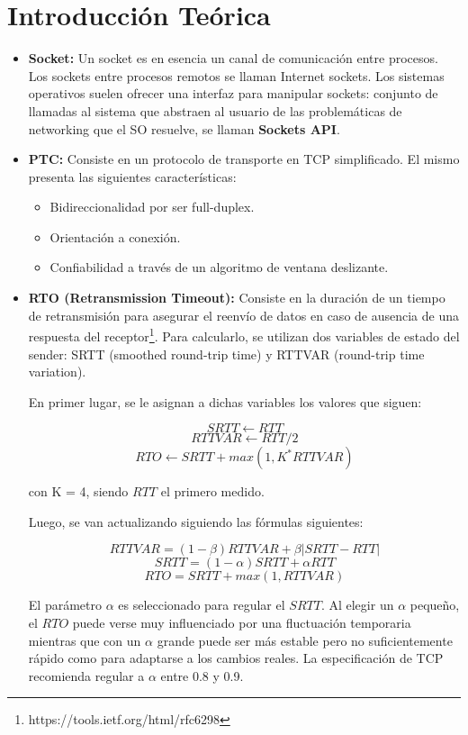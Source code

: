 \documentclass[10pt, a4paper]{article}
\begin{document}
\section{Introducción Teórica}
\begin{itemize}

\item \textbf{Socket:} Un socket es en esencia un canal de comunicación entre procesos. Los sockets entre procesos remotos se llaman Internet sockets. Los sistemas operativos suelen ofrecer una interfaz para manipular sockets: conjunto de llamadas al sistema que abstraen al usuario de las problemáticas de networking que el SO resuelve, se llaman \textbf{Sockets API}.

\item \textbf{PTC:} Consiste en un protocolo de transporte en TCP simplificado. El mismo presenta las siguientes características:
\begin{itemize} 
\item Bidireccionalidad por ser full-duplex.
\item Orientación a conexión.
\item Confiabilidad a través de un algoritmo de ventana deslizante.
\end{itemize}

\item \textbf{RTO (Retransmission Timeout):} Consiste en la duración de un tiempo de retransmisión para asegurar el reenvío de datos en caso de ausencia de una respuesta del receptor\footnote{https://tools.ietf.org/html/rfc6298}. Para calcularlo, se utilizan dos variables de estado del sender: SRTT (smoothed round-trip time) y RTTVAR (round-trip time variation).

En primer lugar, se le asignan a dichas variables los valores que siguen:

			$$SRTT \leftarrow RTT$$
            $$RTTVAR \leftarrow RTT/2$$
            $$RTO \leftarrow SRTT + max(1, K^*RTTVAR)$$
            
con K = 4, siendo $RTT$ el primero medido.

Luego, se van actualizando siguiendo las fórmulas siguientes:

$$RTTVAR = (1 - \beta) RTTVAR + \beta |SRTT - RTT|$$
$$SRTT = (1 - \alpha)SRTT + \alpha RTT$$
$$RTO = SRTT + max(1, RTTVAR)$$

El parámetro $\alpha$ es seleccionado para regular el $SRTT$. Al elegir un $\alpha$ pequeño, el $RTO$ puede verse muy influenciado por una fluctuación temporaria mientras que con un $\alpha$ grande puede ser más estable pero no suficientemente rápido como para adaptarse a los cambios reales. La especificación de TCP recomienda regular a $\alpha$ entre 0.8 y 0.9.
\end{itemize}
\end{document}
